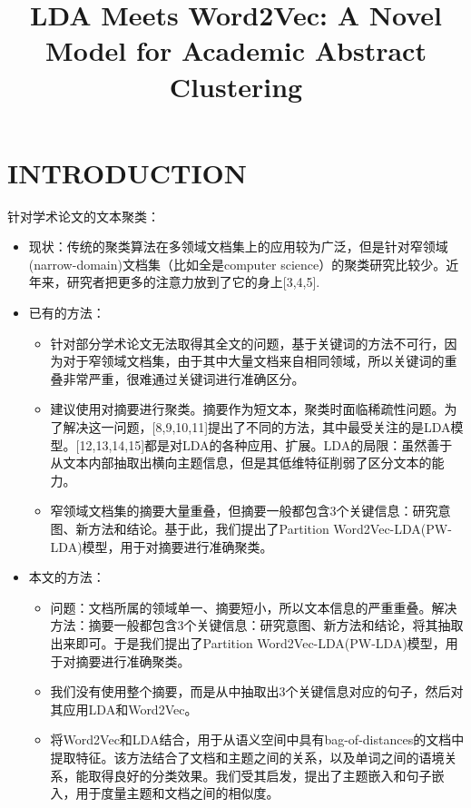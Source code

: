 \documentclass{article}
\begin{document}
\title{LDA Meets Word2Vec: A Novel Model for Academic Abstract Clustering}
\date{}
\maketitle

\section{INTRODUCTION}
针对学术论文的文本聚类：
\begin{itemize}
	\item 现状：传统的聚类算法在多领域文档集上的应用较为广泛，但是针对窄领域(narrow-domain)文档集（比如全是computer science）的聚类研究比较少。近年来，研究者把更多的注意力放到了它的身上[3,4,5].
	\item 已有的方法：
	\begin{itemize}
		\item 针对部分学术论文无法取得其全文的问题，基于关键词的方法不可行，因为对于窄领域文档集，由于其中大量文档来自相同领域，所以关键词的重叠非常严重，很难通过关键词进行准确区分。
		\item \text{[5,6]}建议使用对摘要进行聚类。摘要作为短文本，聚类时面临稀疏性问题。为了解决这一问题，[8,9,10,11]提出了不同的方法，其中最受关注的是LDA模型。[12,13,14,15]都是对LDA的各种应用、扩展。LDA的局限：虽然善于从文本内部抽取出横向主题信息，但是其低维特征削弱了区分文本的能力。
		\item 窄领域文档集的摘要大量重叠，但摘要一般都包含3个关键信息：研究意图、新方法和结论。基于此，我们提出了Partition Word2Vec-LDA(PW-LDA)模型，用于对摘要进行准确聚类。
	\end{itemize}
	\item 本文的方法：
	\begin{itemize}
		\item 问题：文档所属的领域单一、摘要短小，所以文本信息的严重重叠。解决方法：摘要一般都包含3个关键信息：研究意图、新方法和结论，将其抽取出来即可。于是我们提出了Partition Word2Vec-LDA(PW-LDA)模型，用于对摘要进行准确聚类。
		\item 我们没有使用整个摘要，而是从中抽取出3个关键信息对应的句子，然后对其应用LDA和Word2Vec。
		\item \text{[18]}将Word2Vec和LDA结合，用于从语义空间中具有bag-of-distances的文档中提取特征。该方法结合了文档和主题之间的关系，以及单词之间的语境关系，能取得良好的分类效果。我们受其启发，提出了主题嵌入和句子嵌入，用于度量主题和文档之间的相似度。
	\end{itemize}
\end{itemize}
\end{document}
